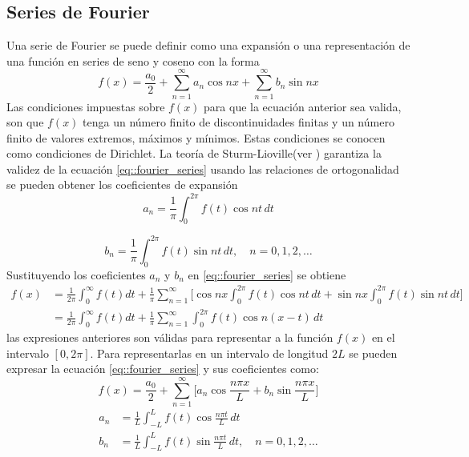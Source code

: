 \documentclass[a4paper]{article}
\begin{document}
\subsection{Series de Fourier}
Una serie de Fourier se puede definir como una expansión o una representación de una función en series de seno y coseno con la forma 
\begin{equation}\label{eq::fourier_series}
f(x)=\frac{a_0}{2}+\sum_{n=1}^\infty a_n \cos nx + \sum_{n=1}^\infty b_n \sin nx
\end{equation}
Las condiciones impuestas sobre $f(x)$ para que la ecuación anterior sea valida, son que $f(x)$ tenga un número finito de discontinuidades finitas y un número finito de valores extremos, máximos y mínimos. Estas condiciones se conocen como condiciones de Dirichlet. La teoría de Sturm-Lioville(ver \cite{Arfken}) garantiza la validez de la ecuación \ref{eq::fourier_series} usando las relaciones de ortogonalidad se pueden obtener los coeficientes de expansión
\begin{equation*}
a_n=\frac{1}{\pi} \int^{2\pi}_0 f(t) \cos{nt}\, dt
\end{equation*}

\begin{equation*}
b_n=\frac{1}{\pi} \int^{2\pi}_0 f(t) \sin{nt}\, dt, \,\,\,\,\,\, n=0,1,2,\hdots
\end{equation*}
Sustituyendo los coeficientes $a_n$ y $b_n$ en \ref{eq::fourier_series} se obtiene
\begin{equation}
\begin{aligned}
f(x)&=\frac{1}{2\pi}\int_0^\infty f(t)dt+\frac{1}{\pi}\sum_{n=1}^\infty\Big[ \cos{nx}\int_0^{2\pi} f(t) \cos{nt}\,dt + \sin{nx}\int_0^{2\pi} f(t) \sin{nt}\,dt \Big]\\
&=\frac{1}{2\pi}\int_0^\infty f(t)dt+\frac{1}{\pi}\sum^\infty_{n=1} \int^{2\pi}_0 f(t)\cos{n(x-t)\,dt}
\end{aligned}
\end{equation}
las expresiones anteriores son válidas para representar a la función $f(x)$ en el intervalo $[0,2\pi]$. Para representarlas en un intervalo de longitud $2L$ se pueden expresar la ecuación \ref{eq::fourier_series} y sus coeficientes como:
\begin{equation}
f(x)=\frac{a_0}{2}+\sum_{n=1}^\infty \Big[ a_n \cos{\frac{n\pi x}{L}} + b_n \sin{\frac{n\pi x}{L}} \Big]
\end{equation}
\begin{equation}\label{eq::Fourier_coeff}
\begin{aligned}
a_n&=\frac{1}{L} \int^{L}_{-L} f(t) \cos{\frac{n\pi t}{L}}\, dt \\
b_n&=\frac{1}{L} \int^{L}_{-L} f(t) \sin{\frac{n\pi t}{L}}\, dt, \,\,\,\,\,\, n=0,1,2,\hdots
\end{aligned}
\end{equation}
\end{document}
